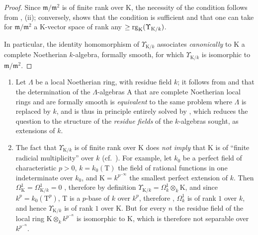 \begin{proof}
Since $\mathfrak{m}/\mathfrak{m}^2$ is of finite rank over $\mathrm{K}$, the necessity of the condition follows from , (ii); conversely,  shows that the condition is sufficient and that one can take for $\mathfrak{m}/\mathfrak{m}^2$ a $\mathrm{K}$-vector space of rank any $\geq\operatorname{rg}_\mathrm{K}(\Upsilon_{\mathrm{K}/k})$.

In particular, the identity homomorphism of $\Upsilon_{\mathrm{K}/k}$ associates \emph{canonically} to $\mathrm{K}$ a complete Noetherian $k$-algebra, formally smooth, for which $\Upsilon_{\mathrm{K}/k}$ is isomorphic to $\mathfrak{m}/\mathfrak{m}^2$.
\end{proof}

\begin{remarks}[22.2.7]
\label{0.22.2.7}
\begin{enumerate}
  \item[\rm{(i)}] Let $\Lambda$ be a local Noetherian ring, with residue field $k$; it follows from  and  that the determination of the $\Lambda$-algebras $\mathrm{A}$ that are complete Noetherian local rings and are formally smooth is \emph{equivalent} to the same problem where $\Lambda$ is replaced by $k$, and is thus in principle entirely solved by , which reduces the question to the structure of the \emph{residue fields} of the $k$-algebras sought, as extensions of $k$.
  \item[\rm{(ii)}] The fact that $\Upsilon_{\mathrm{K}/k}$ is of finite rank over $\mathrm{K}$ does \emph{not imply} that $\mathrm{K}$ is of ``finite radicial multiplicity'' over $k$ (cf.~).
  For example, let $k_0$ be a perfect field of characteristic $p>0$, $k=k_0(\mathrm{T})$ the field of rational functions in one indeterminate over $k_0$, and $\mathrm{K}=k^{p^{-\infty}}$ the smallest perfect extension of $k$.
  Then $\Omega^1_\mathrm{K}=\Omega^1_{\mathrm{K}/k}=0$ , therefore by definition  $\Upsilon_{\mathrm{K}/k}=\Omega^1_k\otimes_k\mathrm{K}$, and since $k^p=k_0(\mathrm{T}^p)$, $\mathrm{T}$ is a $p$-base of $k$ over $k^p$, therefore , $\Omega^1_k$ is of rank $1$ over $k$, and hence $\Upsilon_{\mathrm{K}/k}$ is of rank $1$ over $\mathrm{K}$.
  But for every $n$ the residue field of the local ring $\mathrm{K}\otimes_kk^{p^{-n}}$ is isomorphic to $\mathrm{K}$, which is therefore not separable over $k^{p^{-n}}$.
\end{enumerate}
\end{remarks}

